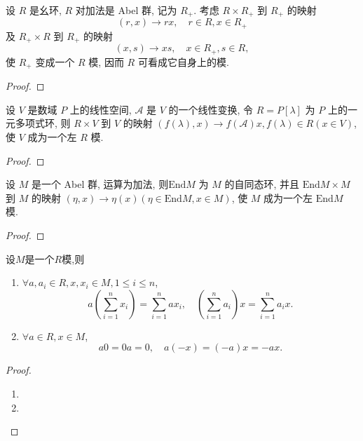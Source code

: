 \documentclass[../../main.tex]{subfiles}%
\begin{document}
\begin{example}
设 \( R \) 是幺环, \( R \) 对加法是 Abel 群, 记为 \( R_+ \). 考虑 \( R \times R_+ \) 到 \( R_+ \) 的映射
\[
(r,x) \to rx, \quad r \in R, x \in R_+
\]
及 \( R_+ \times R \) 到 \( R_+ \) 的映射
\[
(x,s) \to xs, \quad x \in R_+, s \in R,
\]
使 \( R_+ \) 变成一个 \( R \) 模, 因而 \( R \) 可看成它自身上的模.
\end{example}
\begin{proof}

\end{proof}

\begin{example}\label{example:抽象代数-例题1.6.4}
设 \( V \) 是数域 \( P \) 上的线性空间, \( \mathcal{A} \) 是 \( V \) 的一个线性变换, 令 \( R = P[\lambda] \) 为 \( P \) 上的一元多项式环, 则 \( R \times V \) 到 \( V \) 的映射 \( (f(\lambda),x) \to f(\mathcal{A})x, f(\lambda) \in R (x \in V) \), 使 \( V \) 成为一个左 \( R \) 模.
\end{example}
\begin{proof}

\end{proof}

\begin{example}
设 \( M \) 是一个 Abel 群, 运算为加法, 则\( \text{End}M \) 为 \( M \) 的自同态环, 并且 \( \text{End}M \times M \) 到 \( M \) 的映射 \( (\eta,x) \to \eta(x) (\eta \in \text{End}M, x \in M) \), 使 \( M \) 成为一个左 \( \text{End}M \) 模.
\end{example}
\begin{proof}

\end{proof}

\begin{theorem}
设$M$是一个$R$模,则
\begin{enumerate}[(1)]
\item  \( \forall a,a_i \in R, x,x_i \in M, 1 \leqslant i \leqslant n \),
\[
a\left( \sum_{i=1}^n x_i \right) = \sum_{i=1}^n ax_i, \quad \left( \sum_{i=1}^n a_i \right) x = \sum_{i=1}^n a_i x.
\]

\item \( \forall a \in R, x \in M \),
\[
a0 = 0a = 0, \quad a(-x) = (-a)x = -ax.
\]
\end{enumerate}
\end{theorem}
\begin{proof}
\begin{enumerate}[(1)]
\item 

\item 
\end{enumerate}
\end{proof}
\end{document}
